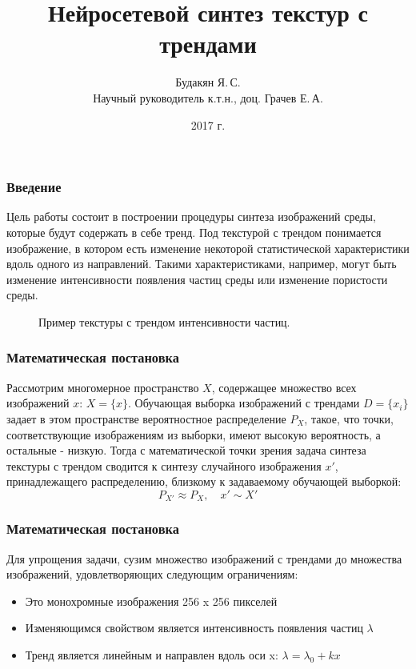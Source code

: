 \documentclass[9pt]{beamer}
\begin{document}
\title{Нейросетевой синтез текстур с трендами}
\author{Будакян Я.\,С. \\ Научный руководитель к.т.н., доц. Грачев Е.\,А.}
\date{2017 г.} 

\maketitle

\begin{frame}\frametitle{Введение}
	Цель работы состоит в построении процедуры синтеза изображений среды, которые будут содержать в себе тренд. Под текстурой с трендом понимается изображение, в котором есть изменение некоторой статистической характеристики вдоль одного из направлений. Такими характеристиками, например, могут быть изменение интенсивности появления частиц среды или изменение пористости среды. \\
	\begin{figure}
		\caption{Пример текстуры с трендом интенсивности частиц.}
		\label{trend-example}
	\end{figure}
\end{frame}

\begin{frame}\frametitle{Математическая постановка}
	Рассмотрим многомерное пространство $X$, содержащее множество всех изображений $x$: $X = \{x\}$. Обучающая выборка изображений с трендами $D = \{x_i\}$ задает в этом пространстве вероятностное распределение $P_X$, такое, что точки, соответствующие изображениям из выборки, имеют высокую вероятность, а остальные - низкую. Тогда с математической точки зрения задача синтеза текстуры с трендом сводится к синтезу случайного изображения $x'$, принадлежащего распределению, близкому к задаваемому обучающей выборкой:
	$$ P_{X'} \approx P_X, \quad x' \sim X'$$
\end{frame}

\begin{frame}\frametitle{Математическая постановка}
	Для упрощения задачи, сузим множество изображений с трендами до множества изображений, удовлетворяющих следующим ограничениям:
	\begin{itemize}
		\item Это монохромные изображения 256 x 256 пикселей
		\item Изменяющимся свойством является интенсивность появления частиц $\lambda$
		\item Тренд является линейным и направлен вдоль оси x: 
		$ \lambda = \lambda_0 + kx $
	\end{itemize}
\end{frame}
\end{document}
